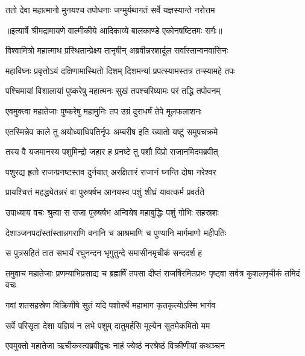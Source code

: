 \twolineshloka
{ततो देवा महात्मानो मुनयश्च तपोधनाः}
{जग्मुर्यथागतं सर्वे यज्ञस्यान्ते नरोत्तम} %


{॥इत्यार्षे श्रीमद्रामायणे वाल्मीकीये आदिकाव्ये बालकाण्डे एकोनषष्टितमः सर्गः॥}


\twolineshloka
{विश्वामित्रो महात्माथ प्रस्थितान्प्रेक्ष्य तानृषीन्}
{अब्रवीन्नरशार्दूल सर्वांस्तान्वनवासिनः} %

\twolineshloka
{महाविघ्नः प्रवृत्तोऽयं दक्षिणामास्थितो दिशम्}
{दिशमन्यां प्रपत्स्यामस्तत्र तप्स्यामहे तपः} %

\twolineshloka
{पश्चिमायां विशालायां पुष्करेषु महात्मनः}
{सुखं तपश्चरिष्यामः परं तद्धि तपोवनम्} %

\twolineshloka
{एवमुक्त्वा महातेजाः पुष्करेषु महामुनिः}
{तप उग्रं दुराधर्षं तेपे मूलफलाशनः} %

\twolineshloka
{एतस्मिन्नेव काले तु अयोध्याधिपतिर्नृपः}
{अम्बरीष इति ख्यातो यष्टुं समुपचक्रमे} %

\twolineshloka
{तस्य वै यजमानस्य पशुमिन्द्रो जहार ह}
{प्रनष्टे तु पशौ विप्रो राजानमिदमब्रवीत्} %

\twolineshloka
{पशुरद्य हृतो राजन्प्रनष्टस्तव दुर्नयात्}
{अरक्षितारं राजानं घ्नन्ति दोषा नरेश्वर} %

\twolineshloka
{प्रायश्चित्तं महद्ध्येतन्नरं वा पुरुषर्षभ}
{आनयस्व पशुं शीघ्रं यावत्कर्म प्रवर्तते} %

\twolineshloka
{उपाध्याय वचः श्रुत्वा स राजा पुरुषर्षभ}
{अन्वियेष महाबुद्धिः पशुं गोभिः सहस्रशः} %

\twolineshloka
{देशाञ्जनपदांस्तांस्तान्नगराणि वनानि च}
{आश्रमाणि च पुण्यानि मार्गमाणो महीपतिः} %

\twolineshloka
{स पुत्रसहितं तात सभार्यं रघुनन्दन}
{भृगुतुन्दे समासीनमृचीकं सन्ददर्श ह} %

\threelineshloka
{तमुवाच महातेजाः प्रणम्याभिप्रसाद्य च}
{ब्रह्मर्षिं तपसा दीप्तं राजर्षिरमितप्रभः}
{पृष्ट्वा सर्वत्र कुशलमृचीकं तमिदं वचः} %

\twolineshloka
{गवां शतसहस्रेण विक्रिणीषे सुतं यदि}
{पशोरर्थे महाभाग कृतकृत्योऽस्मि भार्गव} %

\twolineshloka
{सर्वे परिसृता देशा यज्ञियं न लभे पशुम्}
{दातुमर्हसि मूल्येन सुतमेकमितो मम} %

\twolineshloka
{एवमुक्तो महातेजा ऋचीकस्त्वब्रवीद्वचः}
{नाहं ज्येष्ठं नरश्रेष्ठं विक्रीणीयां कथञ्चन} %

